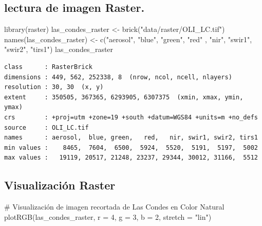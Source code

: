 \documentclass[
  letterpaper,
  DIV=11,
  numbers=noendperiod]{scrreprt}
\newenvironment{Shaded}{\begin{snugshade}}{\end{snugshade}}
\newcommand{\AttributeTok}[1]{\textcolor[rgb]{0.40,0.45,0.13}{#1}}
\newcommand{\CommentTok}[1]{\textcolor[rgb]{0.37,0.37,0.37}{#1}}
\newcommand{\DecValTok}[1]{\textcolor[rgb]{0.68,0.00,0.00}{#1}}
\newcommand{\FunctionTok}[1]{\textcolor[rgb]{0.28,0.35,0.67}{#1}}
\newcommand{\NormalTok}[1]{\textcolor[rgb]{0.00,0.23,0.31}{#1}}
\newcommand{\OtherTok}[1]{\textcolor[rgb]{0.00,0.23,0.31}{#1}}
\newcommand{\StringTok}[1]{\textcolor[rgb]{0.13,0.47,0.30}{#1}}
\begin{document}
\hypertarget{lectura-de-imagen-raster.}{%
\subsection{lectura de imagen Raster.}\label{lectura-de-imagen-raster.}}

\begin{Shaded}
\begin{Highlighting}[]
\FunctionTok{library}\NormalTok{(raster)}
\NormalTok{las\_condes\_raster }\OtherTok{\textless{}{-}} \FunctionTok{brick}\NormalTok{(}\StringTok{"data/raster/OLI\_LC.tif"}\NormalTok{)}
\FunctionTok{names}\NormalTok{(las\_condes\_raster) }\OtherTok{\textless{}{-}} \FunctionTok{c}\NormalTok{(}\StringTok{"aerosol"}\NormalTok{, }\StringTok{"blue"}\NormalTok{, }\StringTok{"green"}\NormalTok{, }\StringTok{"red"}\NormalTok{ , }\StringTok{"nir"}\NormalTok{, }\StringTok{"swir1"}\NormalTok{, }\StringTok{"swir2"}\NormalTok{, }\StringTok{"tirs1"}\NormalTok{)}
\NormalTok{las\_condes\_raster}
\end{Highlighting}
\end{Shaded}

\begin{verbatim}
class      : RasterBrick 
dimensions : 449, 562, 252338, 8  (nrow, ncol, ncell, nlayers)
resolution : 30, 30  (x, y)
extent     : 350505, 367365, 6293905, 6307375  (xmin, xmax, ymin, ymax)
crs        : +proj=utm +zone=19 +south +datum=WGS84 +units=m +no_defs 
source     : OLI_LC.tif 
names      : aerosol,  blue, green,   red,   nir, swir1, swir2, tirs1 
min values :    8465,  7604,  6500,  5924,  5520,  5191,  5197,  5002 
max values :   19119, 20517, 21248, 23237, 29344, 30012, 31166,  5512 
\end{verbatim}

\hypertarget{visualizaciuxf3n-raster}{%
\subsection{Visualización Raster}\label{visualizaciuxf3n-raster}}

\begin{Shaded}
\begin{Highlighting}[]
\CommentTok{\# Visualización de imagen recortada de Las Condes en Color Natural}
\FunctionTok{plotRGB}\NormalTok{(las\_condes\_raster, }\AttributeTok{r =} \DecValTok{4}\NormalTok{, }\AttributeTok{g =} \DecValTok{3}\NormalTok{, }\AttributeTok{b =} \DecValTok{2}\NormalTok{, }\AttributeTok{stretch =} \StringTok{"lin"}\NormalTok{)}
\end{Highlighting}
\end{Shaded}
\end{document}
